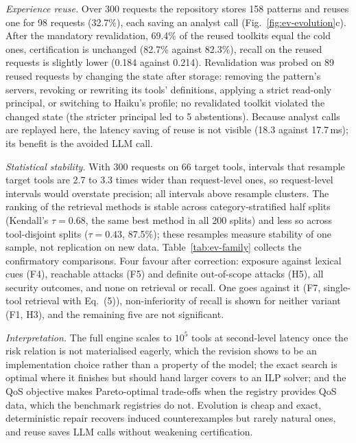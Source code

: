 \emph{Experience reuse.} Over 300 requests the repository stores 158 patterns and reuses one for 98 requests
(32.7\%), each saving an analyst call (Fig.~\ref{fig:ev-evolution}c). After the mandatory revalidation, 69.4\% of
the reused toolkits equal the cold ones, certification is unchanged (82.7\% against 82.3\%), recall on the reused
requests is slightly lower (0.184 against 0.214). Revalidation was probed on 89 reused requests by changing the
state after storage: removing the pattern's servers, revoking or rewriting its tools' definitions, applying a
strict read-only principal, or switching to Haiku's profile; no revalidated toolkit violated the changed state
(the stricter principal led to 5 abstentions). Because analyst calls are replayed here, the latency saving of reuse
is not visible (18.3 against 17.7\,ms); its benefit is the avoided LLM call.



\emph{Statistical stability.} With 300 requests on 66 target tools, intervals that resample target tools are 2.7
to 3.3 times wider than request-level ones, so request-level intervals would overstate precision; all intervals
above resample clusters. The ranking of the retrieval methods is stable across category-stratified half splits
(Kendall's $\tau=0.68$, the same best method in all 200 splits) and less so across tool-disjoint splits
($\tau=0.43$, 87.5\%); these resamples measure stability of one sample, not replication on new data.
Table~\ref{tab:ev-family} collects the confirmatory comparisons. Four favour \pamcp{} after correction: exposure
against lexical cues (F4), reachable attacks (F5) and definite out-of-scope attacks (H5), all security outcomes,
and none on retrieval or recall. One goes against it (F7, single-tool retrieval with Eq.~(5)), non-inferiority of
recall is shown for neither variant (F1, H3), and the remaining five are not significant.

\emph{Interpretation.} The full engine scales to $10^5$ tools at second-level latency once the risk relation is
not materialised eagerly, which the revision shows to be an implementation choice rather than a property of the
model; the exact search is optimal where it finishes but should hand larger covers to an ILP solver; and the QoS
objective makes Pareto-optimal trade-offs when the registry provides QoS data, which the benchmark registries do
not. Evolution is cheap and exact, deterministic repair recovers induced counterexamples but rarely natural ones,
and reuse saves LLM calls without weakening certification.
